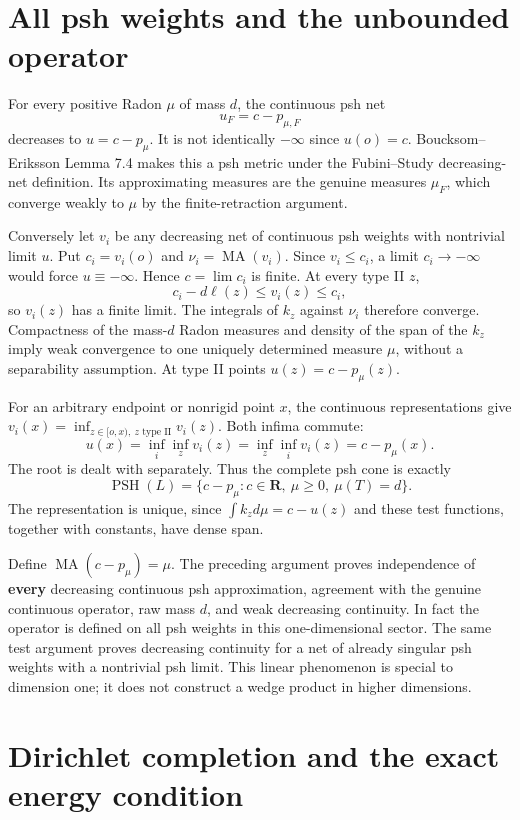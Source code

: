 \documentclass[
  11pt,
]{article}
\begin{document}
\section{All psh weights and the unbounded
operator}\label{all-psh-weights-and-the-unbounded-operator}

For every positive Radon \(\mu\) of mass \(d\), the continuous psh net
\[
u_F=c-p_{\mu,F}
\] decreases to \(u=c-p_\mu\). It is not identically \(-\infty\) since
\(u(o)=c\). Boucksom--Eriksson Lemma 7.4 makes this a psh metric under
the Fubini--Study decreasing-net definition. Its approximating measures
are the genuine measures \(\mu_F\), which converge weakly to \(\mu\) by
the finite-retraction argument.

Conversely let \(v_i\) be any decreasing net of continuous psh weights
with nontrivial limit \(u\). Put \(c_i=v_i(o)\) and
\(\nu_i=\operatorname{MA}(v_i)\). Since \(v_i\leq c_i\), a limit
\(c_i\to-\infty\) would force \(u\equiv-\infty\). Hence \(c=\lim c_i\)
is finite. At every type II \(z\), \[
c_i-d\ell(z)\leq v_i(z)\leq c_i,
\] so \(v_i(z)\) has a finite limit. The integrals of \(k_z\) against
\(\nu_i\) therefore converge. Compactness of the mass-\(d\) Radon
measures and density of the span of the \(k_z\) imply weak convergence
to one uniquely determined measure \(\mu\), without a separability
assumption. At type II points \(u(z)=c-p_\mu(z)\).

For an arbitrary endpoint or nonrigid point \(x\), the continuous
representations give
\(v_i(x)=\inf_{z\in[o,x),\ z\text{ type II}}v_i(z)\). Both infima
commute: \[
u(x)=\inf_i\inf_z v_i(z)=\inf_z\inf_i v_i(z)=c-p_\mu(x).
\] The root is dealt with separately. Thus the complete psh cone is
exactly \[
\operatorname{PSH}(L)=\{c-p_\mu:c\in\mathbf R,\ \mu\geq0,\ \mu(T)=d\}.
\] The representation is unique, since \(\int k_zd\mu=c-u(z)\) and these
test functions, together with constants, have dense span.

Define \(\operatorname{MA}(c-p_\mu)=\mu\). The preceding argument proves
independence of \textbf{every} decreasing continuous psh approximation,
agreement with the genuine continuous operator, raw mass \(d\), and weak
decreasing continuity. In fact the operator is defined on all psh
weights in this one-dimensional sector. The same test argument proves
decreasing continuity for a net of already singular psh weights with a
nontrivial psh limit. This linear phenomenon is special to dimension
one; it does not construct a wedge product in higher dimensions.

\section{Dirichlet completion and the exact energy
condition}\label{dirichlet-completion-and-the-exact-energy-condition}
\end{document}
